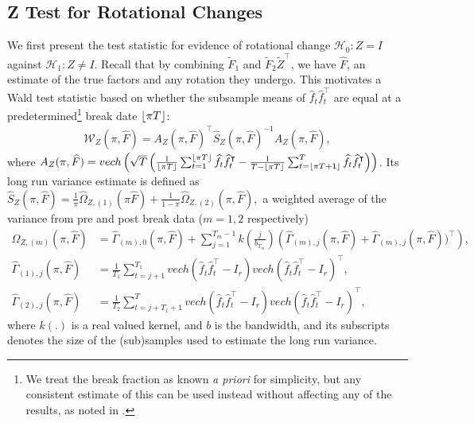 \documentclass[12pt]{article}
\newcommand*{\tran}{\intercal}
\theoremstyle{plain}
\numberwithin{equation}{section}
\begin{document}
\subsection{Z Test for Rotational Changes}
We first present the test statistic for evidence of rotational change $\mathcal{H}_0: Z = I$ against $\mathcal{H}_1: Z \neq I$. Recall that by combining $\tilde{F}_{1}$ and $\tilde{F}_{2} \tilde{Z}^\tran$, we have $\widehat{F}$, an estimate of the true factors and any rotation they undergo. This motivates a Wald test statistic based on whether the subsample means of $\widehat{f}_t \widehat{f}_t^\tran$ are equal at a predetermined\footnote{We treat the break fraction as known \emph{a priori} for simplicity, but any consistent estimate of this can be used instead without affecting any of the results, as noted in .} break date $\left \lfloor \pi T \right \rfloor$:
\begin{align}
\label{eqn:Z_test_stats}
\mathscr{W}_Z(\pi, \widehat{F}) = A_Z(\pi, \widehat{F})^\tran \widehat{S}_Z (\pi, \widehat{F})^{-1} A_Z(\pi, \widehat{F}),
\end{align}
where $A_Z(\pi, \widehat{F}) = 
vech\left( 
	\sqrt{T} \left( \frac{1}{\floor{\pi T}} \sumTfloor \widehat{f}_t \widehat{f}_t^\tran - \frac{1}{T - \floor{\pi T}} \sumTfloort \widehat{f}_t \widehat{f}_t^\tran \right)
\right)$. Its long run variance estimate is defined as
$
\widehat{S}_Z(\pi, \widehat{F}) = \frac{1}{\pi} \widehat{\Omega}_{Z, (1)}(\pi \widehat{F}) + \frac{1}{1 - \pi} \widehat{\Omega}_{Z, (2)}(\pi, \widehat{F}),
$
a weighted average of the variance from pre and post break data ($m = 1, 2$ respectively)
\begin{align}
\widehat{\Omega}_{Z, (m)}(\pi, \widehat{F}) &= \widehat{\Gamma}_{(m), 0} (\pi, \widehat{F}) \nonumber + 
\sum_{j = 1}^{T_m - 1} k \left( \frac{j}{b_{T_m}} \right) \left( \widehat{\Gamma}_{(m), j} (\pi, \widehat{F}) + \widehat{\Gamma}_{(m), j} (\pi, \widehat{F}))^\tran \right), \\
\widehat{\Gamma}_{(1), j} (\pi, \widehat{F}) &=  
\frac{1}{T_1} \sum_{t = j + 1}^{T_1}
vech( \widehat{f}_t \widehat{f}_t^\tran - I_r)
vech( \widehat{f}_t \widehat{f}_t^\tran - I_r)^\tran, \\
\widehat{\Gamma}_{(2), j} (\pi, \widehat{F}) &= 
\frac{1}{T_2} \sum_{t = j + T_1 + 1}^{T}
vech( \widehat{f}_t \widehat{f}_t^\tran - I_r)
vech( \widehat{f}_t \widehat{f}_t^\tran - I_r)^\tran,
\end{align}
where $k(.)$ is a real valued kernel, and $b$ is the bandwidth, and its subscripts denotes the size of the (sub)samples used to estimate the long run variance.
\end{document}

